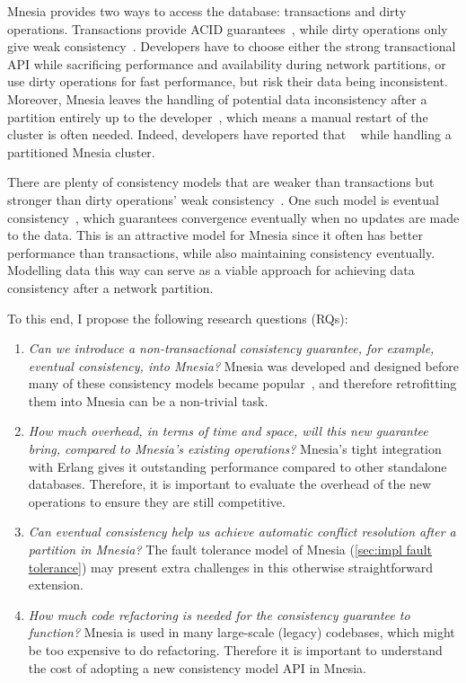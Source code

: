 Mnesia provides two ways to access the database: transactions
and dirty operations. Transactions provide ACID guarantees~\cite{haerder1983dbtransaction}, 
while dirty operations only give weak consistency~\cite{vogels2008ec}. Developers 
have to choose either the
strong transactional API while sacrificing performance and availability during
network partitions, or use dirty operations for fast performance, but risk their
data being inconsistent.  Moreover, Mnesia leaves the handling of potential
data inconsistency after a partition entirely up to the 
developer~\cite{ericssonab2023mnesiaguide}, which means a manual 
restart of the cluster is often needed. Indeed, developers have reported that
~\cite{mineiro2008DukesofErl} 
while handling a partitioned Mnesia cluster. 


There are plenty of consistency models that are weaker than transactions but stronger
than dirty operations' weak consistency~\cite{ericssonab2023mnesiaref}. 
One such model is eventual consistency~\cite{vogels2008ec}, which
guarantees convergence eventually when no updates are made to the data. This is an attractive
model for Mnesia since it often has better performance than transactions, while
also maintaining consistency eventually. Modelling data this way can serve
as a viable approach for achieving data consistency after a network partition.

To this end, I propose the following research questions (RQs):

\begin{enumerate}[label={RQ\arabic*.},ref={RQ\arabic*}]
  \item \emph{Can we introduce a non-transactional consistency guarantee, for example,
  eventual consistency, into Mnesia?} Mnesia was developed and designed before many
  of these consistency models became popular~\cite{mattsson1998mnesia}, and therefore 
  retrofitting them into Mnesia can be a non-trivial task.  \label{itm:question ec possible}
  \item \emph{How much overhead, in terms of time and space, will this new guarantee
  bring, compared to Mnesia's existing operations?} Mnesia's tight integration with
  Erlang gives it outstanding performance compared to other standalone databases.
  Therefore, it is important to evaluate the overhead of the new operations to
  ensure they are still competitive. \label{itm:question ec overhead}
  \item \emph{Can eventual consistency help us achieve automatic conflict resolution
  after a partition in Mnesia?} The fault tolerance model of 
  Mnesia (\cref{sec:impl fault tolerance}) may present extra challenges in this 
  otherwise straightforward extension. \label{itm:question ec conflict}
  \item \emph{How much code refactoring is needed for the consistency guarantee to
  function?} Mnesia is used in many large-scale (legacy) codebases, which might
  be too expensive to do refactoring. Therefore it is important to understand 
  the cost of adopting a new consistency model API in Mnesia.  
  \label{itm:question ec refactor}
\end{enumerate}


